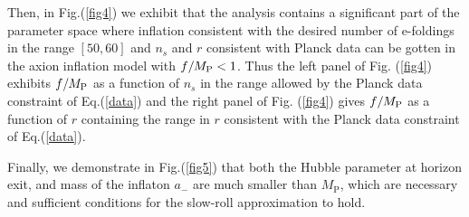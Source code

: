 \documentclass[a4paper,11pt]{article}
\begin{document}
  Then, in Fig.(\ref{fig4}) we exhibit that the analysis contains a significant part of the parameter space where
  inflation consistent with the desired number of e-foldings in the range $[50,60]$ and $n_s$ and $r$ consistent
  with Planck data can be gotten in the axion inflation model with $f/M_{\rm P} <1$. Thus the left panel
  of Fig. (\ref{fig4}) exhibits $f/M_{\rm P}$ as a function of $n_s$ in the range allowed by the Planck data constraint of Eq.(\ref{data})
  and the right panel of Fig. (\ref{fig4}) gives $f/M_{\rm P}$ as a function of $r$
  containing the range in $r$ consistent with the Planck data constraint of Eq.(\ref{data}).

  Finally, we demonstrate in Fig.(\ref{fig5}) that both the Hubble parameter at horizon exit, and
  mass of the inflaton $a_-$ are much smaller than $M_\text{P}$, which are necessary and sufficient
  conditions for the slow-roll approximation to hold.

\end{document}
